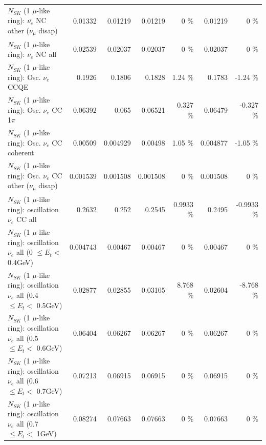\begin{table}
\begin{tabular}{| l | r | r | r  r | r  r |}
          $N_{SK}$ (1 $\mu$-like ring): $\bar{\nu_e}$ NC other ($\nu_\mu$ disap) &         0.01332 &         0.01219 &         0.01219 &        0 \%  &         0.01219 &        0 \%  \\ 
                            $N_{SK}$ (1 $\mu$-like ring): $\bar{\nu_{e}}$ NC all &         0.02539 &         0.02037 &         0.02037 &        0 \%  &         0.02037 &        0 \%  \\ 
\hline
\hline
\hline
                                 $N_{SK}$ (1 $\mu$-like ring): Osc. $\nu_e$ CCQE &          0.1926 &          0.1806 &          0.1828 &     1.24 \%  &          0.1783 &    -1.24 \%  \\ 
                            $N_{SK}$ (1 $\mu$-like ring): Osc. $\nu_e$ CC 1$\pi$ &         0.06392 &           0.065 &         0.06521 &    0.327 \%  &         0.06479 &   -0.327 \%  \\ 
                          $N_{SK}$ (1 $\mu$-like ring): Osc. $\nu_e$ CC coherent &         0.00509 &        0.004929 &         0.00498 &     1.05 \%  &        0.004877 &    -1.05 \%  \\ 
           $N_{SK}$ (1 $\mu$-like ring): Osc. $\nu_e$ CC other ($\nu_\mu$ disap) &        0.001539 &        0.001508 &        0.001508 &        0 \%  &        0.001508 &        0 \%  \\ 
                        $N_{SK}$ (1 $\mu$-like ring): oscillation $\nu_e$ CC all &          0.2632 &           0.252 &          0.2545 &   0.9933 \%  &          0.2495 &  -0.9933 \%  \\ 
\hline
$N_{SK}$ (1 $\mu$-like ring): oscillation $\nu_{e}$ all (0 $\leq E_{t} <$ 0.4GeV) &        0.004743 &         0.00467 &         0.00467 &        0 \%  &         0.00467 &        0 \%  \\ 
$N_{SK}$ (1 $\mu$-like ring): oscillation $\nu_{e}$ all (0.4 $\leq E_{t} <$ 0.5GeV) &         0.02877 &         0.02855 &         0.03105 &    8.768 \%  &         0.02604 &   -8.768 \%  \\ 
$N_{SK}$ (1 $\mu$-like ring): oscillation $\nu_{e}$ all (0.5 $\leq E_{t} <$ 0.6GeV) &         0.06404 &         0.06267 &         0.06267 &        0 \%  &         0.06267 &        0 \%  \\ 
$N_{SK}$ (1 $\mu$-like ring): oscillation $\nu_{e}$ all (0.6 $\leq E_{t} <$ 0.7GeV) &         0.07213 &         0.06915 &         0.06915 &        0 \%  &         0.06915 &        0 \%  \\ 
$N_{SK}$ (1 $\mu$-like ring): oscillation $\nu_{e}$ all (0.7 $\leq E_{t} <$ 1GeV) &         0.08274 &         0.07663 &         0.07663 &        0 \%  &         0.07663 &        0 \%  \\ 

\end{tabular}
\end{table}
